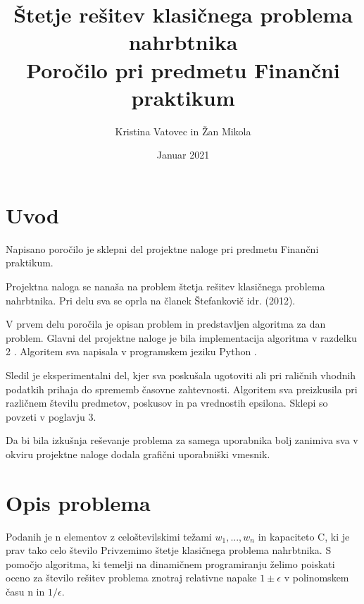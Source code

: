 \documentclass[a4paper,12pt]{article}
\title{ \textbf{ Štetje rešitev klasičnega problema nahrbtnika} \\
  \large Poročilo pri predmetu Finančni praktikum}
\author{Kristina Vatovec in Žan Mikola}
\date{Januar 2021}
\begin{document}
\begin{titlepage}
\maketitle
\thispagestyle{empty}
\pagestyle{empty}
\end{titlepage}


\tableofcontents
\listoffigures

\newpage
\section{Uvod}

\noindent Napisano poročilo je sklepni del projektne naloge pri predmetu Finančni praktikum.
\vspace{3mm}

\noindent Projektna naloga se nanaša na problem štetja rešitev klasičnega problema nahrbtnika. Pri delu sva se oprla na članek Štefankovič idr. (2012).
\vspace{3mm}

\noindent V prvem delu poročila je opisan problem in predstavljen algoritma za dan problem.  Glavni del projektne naloge je bila implementacija algoritma v razdelku 2 . Algoritem sva napisala v programskem jeziku Python . 
\vspace{3mm}

\noindent Sledil je eksperimentalni del, kjer sva poskušala ugotoviti ali pri raličnih vhodnih podatkih prihaja do sprememb časovne zahtevnosti. Algoritem sva preizkusila pri različnem številu predmetov, poskusov in pa vrednostih epsilona.  Sklepi so povzeti v poglavju 3. 
\vspace{3mm}

\noindent 
Da bi bila izkušnja  reševanje problema za samega uporabnika bolj zanimiva sva v okviru projektne naloge dodala grafični uporabniški vmesnik. 


\newpage



\section{Opis problema}


Podanih je n elementov  z celoštevilskimi težami \(w_{1},...,w_{n}\) in kapaciteto C, ki je prav tako celo število  Privzemimo štetje klasičnega problema nahrbtnika.
S pomočjo algoritma, ki temelji na dinamičnem programiranju želimo poiskati oceno za  število rešitev problema znotraj relativne napake \(1 \pm \epsilon\)  v polinomskem času n in \(1/\epsilon\).
 
\end{document}
